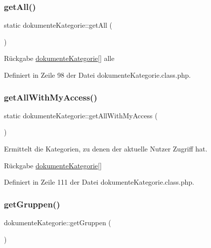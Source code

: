 \subsubsection{\texorpdfstring{get\+All()}{getAll()}}
{\footnotesize\ttfamily static dokumente\+Kategorie\+::get\+All (\begin{DoxyParamCaption}{ }\end{DoxyParamCaption})\hspace{0.3cm}{\ttfamily [static]}}

\begin{DoxyReturn}{Rückgabe}
\mbox{\hyperlink{classdokumente_kategorie}{dokumente\+Kategorie}}\mbox{[}\mbox{]} alle 
\end{DoxyReturn}


Definiert in Zeile 98 der Datei dokumente\+Kategorie.\+class.\+php.

\mbox{\label{classdokumente_kategorie_a64bcff52f84fa4610982775a9e755117}} 
\subsubsection{\texorpdfstring{get\+All\+With\+My\+Access()}{getAllWithMyAccess()}}
{\footnotesize\ttfamily static dokumente\+Kategorie\+::get\+All\+With\+My\+Access (\begin{DoxyParamCaption}{ }\end{DoxyParamCaption})\hspace{0.3cm}{\ttfamily [static]}}

Ermittelt die Kategorien, zu denen der aktuelle Nutzer Zugriff hat. \begin{DoxyReturn}{Rückgabe}
\mbox{\hyperlink{classdokumente_kategorie}{dokumente\+Kategorie}}\mbox{[}\mbox{]} 
\end{DoxyReturn}


Definiert in Zeile 111 der Datei dokumente\+Kategorie.\+class.\+php.

\mbox{\label{classdokumente_kategorie_a6c4053ace49b6043111554ac8a71c082}} 
\subsubsection{\texorpdfstring{get\+Gruppen()}{getGruppen()}}
{\footnotesize\ttfamily dokumente\+Kategorie\+::get\+Gruppen (\begin{DoxyParamCaption}{ }\end{DoxyParamCaption})}

